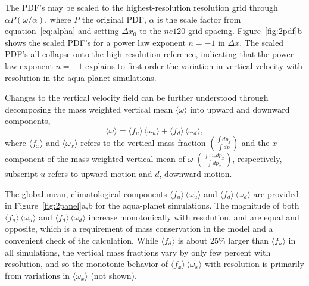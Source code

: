 \documentclass[times]{qjrms4}
\begin{document}
The PDF's may be scaled to the highest-resolution resolution grid through $ \alpha P (\omega / \alpha)$, where $P$ the original PDF, $\alpha$ is the scale factor from equation~\ref{eq:alpha} and setting $\Delta x_0$ to the $ne120$ grid-spacing. Figure~\ref{fig:2pdf}b shows the scaled PDF's for a power law exponent $n=-1$ in $\Delta x$. The scaled PDF's all collapse onto the high-resolution reference, indicating that the power-law exponent $n=-1$ explains to first-order the variation in vertical velocity with resolution in the aqua-planet simulations. 

Changes to the vertical velocity field can be further understood through decomposing the mass weighted vertical mean $ \langle \omega \rangle$ into upward and downward components,
\begin{equation}
\langle \omega \rangle =\langle f_{u} \rangle \, \langle \omega_{u} \rangle + \langle f_{d} \rangle \, \langle \omega_{d} \rangle, \label{eq:omega}
\end{equation}
where $\langle f_x \rangle$ and $\langle \omega_x \rangle$ refers to the vertical mass fraction $ \left( \frac{\int dp_x}{\int dp} \right)$ and the $x$ component of the mass weighted vertical mean of $\omega$ $ \left( \frac{\int \omega_x dp_x}{\int dp_x} \right)$, respectively, subscript $u$ refers to upward motion and $d$, downward motion.

The global mean, climatological components $\langle f_{u} \rangle \, \langle \omega_{u} \rangle$ and $\langle f_{d} \rangle \, \langle \omega_{d} \rangle$ are provided in Figure~\ref{fig:2panel}a,b for the aqua-planet simulations. The magnitude of both $\langle f_{u} \rangle \, \langle \omega_{u} \rangle$ and $\langle f_{d} \rangle \, \langle \omega_{d} \rangle$ increase monotonically with resolution, and are equal and opposite, which is a requirement of mass conservation in the model and a convenient check of the calculation. While $\langle f_{d} \rangle$ is about 25\% larger than $\langle f_{u} \rangle$ in all simulations, the vertical mass fractions vary by only few percent with resolution, and so the monotonic behavior of $\langle f_{x} \rangle \, \langle \omega_{x} \rangle$ with resolution is primarily from variations in $ \langle \omega_{x} \rangle$ (not shown).
\end{document}
